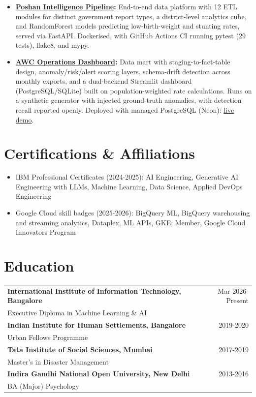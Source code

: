\documentclass[a4paper,10pt]{article}
\begin{document}
\begin{itemize}[itemsep=0pt]
\item \textbf{\href{%%TRACKER_REPO_POSHAN%%}{Poshan Intelligence Pipeline}:} End-to-end data platform with 12 ETL modules for distinct government report types, a district-level analytics cube, and RandomForest models predicting low-birth-weight and stunting rates, served via FastAPI. Dockerised, with GitHub Actions CI running pytest (29 tests), flake8, and mypy.
\item \textbf{\href{%%TRACKER_REPO_AWC%%}{AWC Operations Dashboard}:} Data mart with staging-to-fact-table design, anomaly/risk/alert scoring layers, schema-drift detection across monthly exports, and a dual-backend Streamlit dashboard (PostgreSQL/SQLite) built on population-weighted rate calculations. Runs on a synthetic generator with injected ground-truth anomalies, with detection recall reported openly. Deployed with managed PostgreSQL (Neon): \href{%%TRACKER_DEMO_AWC%%}{live demo}.
\end{itemize}

\section*{Certifications \& Affiliations}

\begin{itemize}[itemsep=1pt]
\item IBM Professional Certificates (2024-2025): AI Engineering, Generative AI Engineering with LLMs, Machine Learning, Data Science, Applied DevOps Engineering
\item Google Cloud skill badges (2025-2026): BigQuery ML, BigQuery warehousing and streaming analytics, Dataplex, ML APIs, GKE; Member, Google Cloud Innovators Program
\end{itemize}

\section*{Education}

\renewcommand{\arraystretch}{0.9}
\begin{tabularx}{\textwidth}{X r}

\textbf{International Institute of Information Technology, Bangalore}
& {\datefont\small Mar 2026-Present} \\
Executive Diploma in Machine Learning \& AI \\

\textbf{Indian Institute for Human Settlements, Bangalore}
& {\datefont\small 2019-2020} \\
Urban Fellows Programme \\

\textbf{Tata Institute of Social Sciences, Mumbai}
& {\datefont\small 2017-2019} \\
Master's in Disaster Management \\

\textbf{Indira Gandhi National Open University, New Delhi}
& {\datefont\small 2013-2016} \\
BA (Major) Psychology \\

\end{tabularx}
\end{document}

